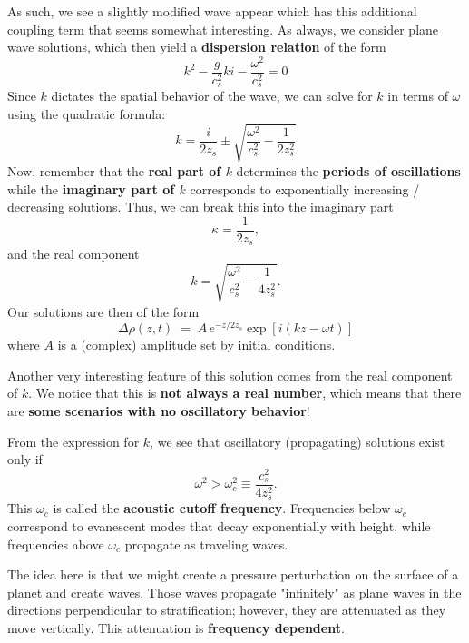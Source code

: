 As such, we see a slightly modified wave appear which has this additional coupling term that seems somewhat interesting. As always, we consider plane wave solutions, which then yield a \textbf{dispersion relation} of the form
\begin{equation}
    k^2 - \frac{g}{c_s^2}ki - \frac{\omega^2}{c_s^2} = 0
\end{equation}
Since $k$ dictates the spatial behavior of the wave, we can solve for $k$ in terms of $\omega$ using the quadratic formula:
\[
\boxed{
k = \frac{i}{2z_s} \pm \sqrt{\frac{\omega^2}{c_s^2} -\frac{1}{2z_s^2}}
}
\]
Now, remember that the \textbf{real part of $k$} determines the \textbf{periods of oscillations} while the \textbf{imaginary part of $k$} corresponds to exponentially increasing / decreasing solutions. Thus, we can break this into the imaginary part
\[
\kappa = \frac{1}{2z_s},
\]
and the real component
\[
k = \sqrt{\frac{\omega^2}{c_s^2} - \frac{1}{4z_s^2}}.
\]
Our solutions are then of the form
\begin{equation}
    \boxed{
    \Delta \rho(z,t) \;=\; A\, e^{-z/2z_s} 
    \exp\!\left[i(kz - \omega t)\right]
    }
\end{equation}
where $A$ is a (complex) amplitude set by initial conditions. 
\par
Another very interesting feature of this  solution comes from the real component of $k$. We notice that this is \textbf{not always a real number}, which means that there are \textbf{some scenarios with no oscillatory behavior}!
\vspace{0.5cm}
\begin{definition}
From the expression for $k$, we see that oscillatory (propagating) solutions exist only if
\[
\omega^2 > \omega_c^2 \equiv \frac{c_s^2}{4 z_s^2}.
\]
This $\omega_c$ is called the \textbf{acoustic cutoff frequency}.
Frequencies below $\omega_c$ correspond to evanescent modes that decay exponentially with height, while frequencies above $\omega_c$ propagate as traveling waves.
\end{definition}
\begin{conceptbox}
    The idea here is that we might create a pressure perturbation on the surface of a planet and create waves. Those waves propagate "infinitely" as plane waves in the directions perpendicular to stratification; however, they are attenuated as they move vertically. This attenuation is \textbf{frequency dependent}.
\end{conceptbox}


